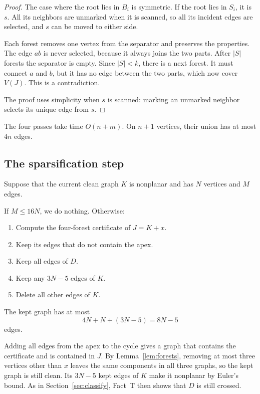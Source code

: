 \documentclass[11pt]{article}
\begin{document}
\begin{proof}
The case where the root lies in $B_i$ is symmetric. If the root lies in $S_i$,
it is $s$. All its neighbors are unmarked when it is scanned, so all its
incident edges are selected, and $s$ can be moved to either side.

Each forest removes one vertex from the separator and preserves the properties. The edge
$ab$ is never selected, because it always joins the two parts. After $|S|$
forests the separator is empty. Since $|S|<k$, there is a next forest. It must
connect $a$ and $b$, but it has no edge between the two parts, which now cover
$V(J)$. This is a contradiction.

The proof uses simplicity when $s$ is scanned: marking an unmarked neighbor
selects its unique edge from $s$.
\end{proof}

The four passes take time $O(n+m)$. On $n+1$ vertices, their union has at most
$4n$ edges.

\subsection{The sparsification step}\label{sec:sparsify}

Suppose that the current clean graph $K$ is nonplanar and has $N$ vertices and
$M$ edges.

If $M\le16N$, we do nothing. Otherwise:
\begin{enumerate}[nosep]
\item Compute the four-forest certificate of $J=K+x$.
\item Keep its edges that do not contain the apex.
\item Keep all edges of $D$.
\item Keep any $3N-5$ edges of $K$.
\item Delete all other edges of $K$.
\end{enumerate}

The kept graph has at most
\begin{equation*}
4N+N+(3N-5)=8N-5
\end{equation*}
edges.

Adding all edges from the apex to the cycle gives a graph that contains the
certificate and is contained in $J$. By Lemma~\ref{lem:forests}, removing at
most three vertices other than $x$ leaves the same components in all three
graphs, so the kept graph is still clean. Its $3N-5$ kept edges of $K$ make it
nonplanar by Euler's bound. As in Section~\ref{sec:classify}, Fact~T then
shows that $D$ is still crossed.
\end{document}
